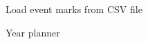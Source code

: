 \begin{extrafullwidth}

\hfill
\begin{minipage}{0.31\linewidth}
\centering

Load event marks from CSV file

\bigskip


\end{minipage}%
\begin{minipage}{0.31\linewidth}
\centering

Year planner

\bigskip


\end{minipage}
\end{extrafullwidth}
